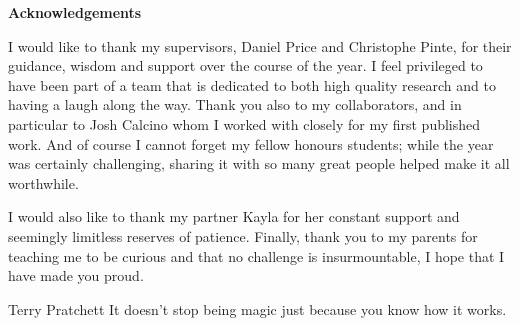 {}

\begin{center}
    
    {\Large \textbf{Acknowledgements}}
    
\end{center}

\noindent I would like to thank my supervisors, Daniel Price and Christophe Pinte, for their guidance, wisdom and support over the course of the year.
I feel privileged to have been part of a team that is dedicated to both high quality research and to having a laugh along the way.
Thank you also to my collaborators, and in particular to Josh Calcino whom I worked with closely for my first published work.
And of course I cannot forget my fellow honours students; while the year was certainly challenging, sharing it with so many great people helped make it all worthwhile.

I would also like to thank my partner Kayla for her constant support and seemingly limitless reserves of patience.
Finally, thank you to my parents for teaching me to be curious and that no challenge is insurmountable, I hope that I have made you proud.

\vfill

\begin{chapquote}{Terry Pratchett}
    It doesn't stop being magic just because you know how it works.
\end{chapquote}

\newpage